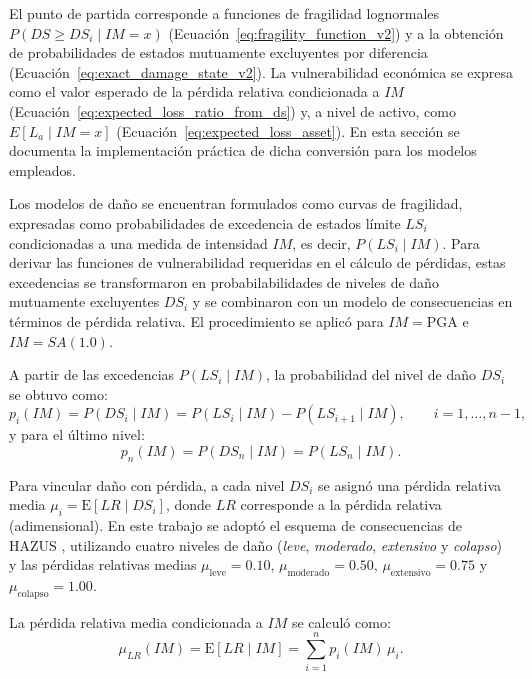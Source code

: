 El punto de partida corresponde a funciones de fragilidad lognormales $P(DS\ge DS_i\mid IM=x)$ (Ecuación~\ref{eq:fragility_function_v2}) y a la obtención de probabilidades de estados mutuamente excluyentes por diferencia (Ecuación~\ref{eq:exact_damage_state_v2}). La vulnerabilidad económica se expresa como el valor esperado de la pérdida relativa condicionada a $IM$ (Ecuación~\ref{eq:expected_loss_ratio_from_ds}) y, a nivel de activo, como $E[L_a\mid IM=x]$ (Ecuación~\ref{eq:expected_loss_asset}). En esta sección se documenta la implementación práctica de dicha conversión para los modelos empleados.

Los modelos de daño se encuentran formulados como curvas de fragilidad, expresadas como probabilidades de excedencia de estados límite $LS_i$ condicionadas a una medida de intensidad $IM$, es decir, $P(LS_i \mid IM)$. Para derivar las funciones de vulnerabilidad requeridas en el cálculo de pérdidas, estas excedencias se transformaron en probabilabilidades de niveles de daño mutuamente excluyentes $DS_i$ y se combinaron con un modelo de consecuencias en términos de pérdida relativa. El procedimiento se aplicó para $IM=\mathrm{PGA}$ e $IM=SA(1.0)$.

A partir de las excedencias $P(LS_i \mid IM)$, la probabilidad del nivel de daño $DS_i$ se obtuvo como:
\begin{equation}
\label{eq:ds_from_ls}
p_i(IM)=P(DS_i\mid IM)=P(LS_i\mid IM)-P(LS_{i+1}\mid IM), \qquad i=1,\ldots,n-1,
\end{equation}
y para el último nivel:
\begin{equation}
\label{eq:ds_last}
p_n(IM)=P(DS_n\mid IM)=P(LS_n\mid IM).
\end{equation}

Para vincular daño con pérdida, a cada nivel $DS_i$ se asignó una pérdida relativa media $\mu_i=\mathrm{E}[LR\mid DS_i]$, donde $LR$ corresponde a la pérdida relativa (adimensional). En este trabajo se adoptó el esquema de consecuencias de HAZUS , utilizando cuatro niveles de daño (\textit{leve}, \textit{moderado}, \textit{extensivo} y \textit{colapso}) y las pérdidas relativas medias $\mu_{\text{leve}}=0.10$, $\mu_{\text{moderado}}=0.50$, $\mu_{\text{extensivo}}=0.75$ y $\mu_{\text{colapso}}=1.00$.

La pérdida relativa media condicionada a $IM$ se calculó como:
\begin{equation}
\label{eq:mu_lr}
\mu_{LR}(IM)=\mathrm{E}[LR\mid IM]=\sum_{i=1}^{n} p_i(IM)\,\mu_i.
\end{equation}

